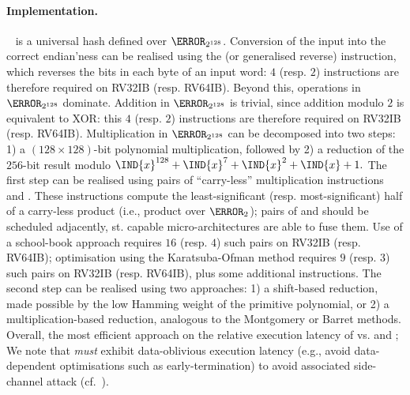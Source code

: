 
\paragraph{Implementation.}

~\cite[Section 6.4]{NIST:sp.800.38d} is a universal hash defined 
over $\F_{2^{128}}$.
Conversion of the input into the correct endian'ness can be realised using
the 
 (or generalised reverse)
instruction,
which reverses the bits in each byte of an input word:
$4$ (resp. $2$) 
instructions are therefore required on RV32IB (resp. RV64IB).
Beyond this, operations in $\F_{2^{128}}$ dominate.
Addition       in $\F_{2^{128}}$ 
is trivial, since addition modulo $2$ is equivalent to XOR: this
$4$ (resp. $2$) 
instructions are therefore required on RV32IB (resp. RV64IB).
Multiplication in $\F_{2^{128}}$ 
can be decomposed into two steps:
1) a $( 128 \times 128 )$-bit polynomial multiplication, 
   followed by 
2) a reduction of the $256$-bit result modulo
   $
   \IND{x}^{128} + \IND{x}^{7} + \IND{x}^{2} + \IND{x} + 1 .
   $
The first  step 
can be realised using pairs of ``carry-less'' multiplication instructions
 and .
These instructions compute the least-significant (resp. most-significant) 
half of a carry-less product (i.e., product over $\F_2$); pairs of 
 and 
should be scheduled adjacently, st. capable micro-architectures are able 
to fuse them.
Use of a school-book approach 
requires
$16$ (resp. $4$) such pairs 
on RV32IB (resp. RV64IB);
optimisation using the Karatsuba-Ofman method
requires
$ 9$ (resp. $3$) such pairs 
on RV32IB (resp. RV64IB),
plus some additional  instructions.
The second step
can be realised using two approaches:
1) a          shift-based reduction, made possible by the low Hamming weight of the primitive polynomial,
   or
2) a multiplication-based reduction, analogous to the Montgomery or Barret methods.
Overall, the most efficient approach on the relative execution latency of
vs.
 and ;
We note that 
{\em must} exhibit data-oblivious execution latency 
(e.g., avoid data-dependent optimisations such as early-termination)
to avoid associated side-channel attack (cf.~\cite{GOPT:09}).


